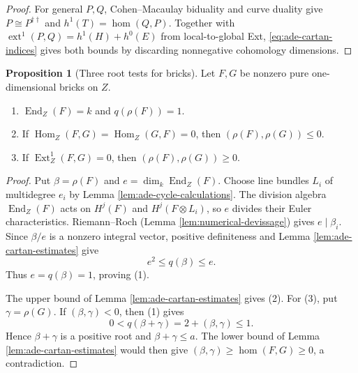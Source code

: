 \documentclass[a4paper,reqno]{amsart}
\DeclareMathOperator{\Hom}{Hom}
\DeclareMathOperator{\End}{End}
\DeclareMathOperator{\Ext}{Ext}
\theoremstyle{definition}
\newtheorem{Prop}[Thm]{Proposition}
\begin{document}
\begin{proof}
For general $P,Q$, Cohen--Macaulay biduality and curve duality \cite[Tags 0B5A and 0BS2]{stacks-project} give $P\cong P^{\dagger\dagger}$ and $h^1(T)=\hom(Q,P)$. Together with $\operatorname{ext}^1(P,Q)=h^1(H)+h^0(E)$ from local-to-global Ext, \eqref{eq:ade-cartan-indices} gives both bounds by discarding nonnegative cohomology dimensions.
\end{proof}

\begin{Prop}[Three root tests for bricks]\label{prop:ade-root-tests}
Let $F,G$ be nonzero pure one-dimensional bricks on $Z$.
\begin{enumerate}
\item $\End_Z(F)=k$ and $q(\rho(F))=1$.
\item If $\Hom_Z(F,G)=\Hom_Z(G,F)=0$, then $(\rho(F),\rho(G))\le0$.
\item If $\Ext_Z^1(F,G)=0$, then $(\rho(F),\rho(G))\ge0$.
\end{enumerate}
\end{Prop}
\begin{proof}
Put $\beta=\rho(F)$ and $e=\dim_k\End_Z(F)$. Choose line bundles $L_i$ of multidegree $e_i$ by Lemma \ref{lem:ade-cycle-calculations}. The division algebra $\End_Z(F)$ acts on $H^j(F)$ and $H^j(F\otimes L_i)$, so $e$ divides their Euler characteristics. Riemann--Roch (Lemma \ref{lem:numerical-devissage}) gives $e\mid\beta_i$. Since $\beta/e$ is a nonzero integral vector, positive definiteness and Lemma \ref{lem:ade-cartan-estimates} give
\[
e^2\le q(\beta)\le e.
\]
Thus $e=q(\beta)=1$, proving (1).

The upper bound of Lemma \ref{lem:ade-cartan-estimates} gives (2). For (3), put $\gamma=\rho(G)$. If $(\beta,\gamma)<0$, then (1) gives
\[
0<q(\beta+\gamma)=2+(\beta,\gamma)\le1.
\]
Hence $\beta+\gamma$ is a positive root and $\beta+\gamma\le a$. The lower bound of Lemma \ref{lem:ade-cartan-estimates} would then give $(\beta,\gamma)\ge\hom(F,G)\ge0$, a contradiction.
\end{proof}
\end{document}
